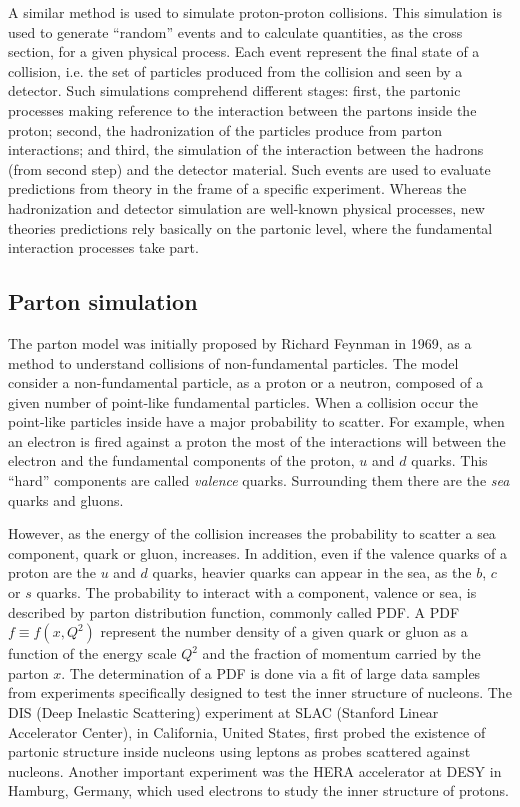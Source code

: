 A similar method is used to simulate proton-proton collisions. This simulation is used to generate ``random'' events and to calculate quantities, as the cross section, for a given physical process. Each event represent the final state of a collision, i.e. the set of particles produced from the collision and seen by a detector. Such simulations comprehend different stages: first, the partonic processes making reference to the interaction between the partons inside the proton; second, the hadronization of the particles produce from parton interactions; and third, the simulation of the interaction between the hadrons (from second step) and the detector material. Such events are used to evaluate predictions from theory in the frame of a specific experiment. Whereas the hadronization and detector simulation are well-known physical processes, new theories predictions rely basically on the partonic level, where the fundamental interaction processes take part.

\subsection{Parton simulation}
\label{sec:parton}

The parton model was initially proposed by Richard Feynman in 1969, as a method to understand collisions of non-fundamental particles. The model consider a non-fundamental particle, as a proton or a neutron, composed of a given number of point-like fundamental particles. When a collision occur the point-like particles inside have a major probability to scatter. For example, when an electron is fired against a proton the most of the interactions will between the electron and the fundamental components of the proton, $u$ and $d$ quarks. This ``hard'' components are called \textit{valence} quarks. Surrounding them there are the \textit{sea} quarks and gluons.

However, as the energy of the collision increases the probability to scatter a sea component, quark or gluon, increases. In addition, even if the valence quarks of a proton are the $u$ and $d$ quarks, heavier quarks can appear in the sea, as the $b$, $c$ or $s$ quarks. The probability to interact with a component, valence or sea, is described by parton distribution function, commonly called PDF. A PDF $f\equiv f(x,Q^{2})$ represent the number density of a given quark or gluon as a function of the energy scale $Q^{2}$ and the fraction of momentum carried by the parton $x$. The determination of a PDF is done via a fit of large data samples from experiments specifically designed to test the inner structure of nucleons. The DIS (Deep Inelastic Scattering) experiment at SLAC (Stanford Linear Accelerator Center), in California, United States, first probed the existence of partonic structure inside nucleons using leptons as probes scattered against nucleons. Another important experiment was the HERA accelerator at DESY in Hamburg, Germany, which used electrons to study the inner structure of protons.

